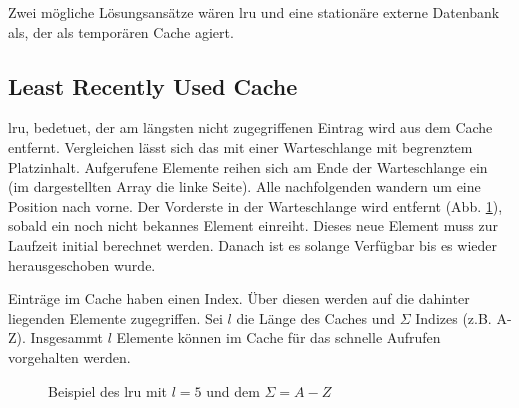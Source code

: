 Zwei mögliche Lösungsansätze wären \ac{lru} und eine stationäre externe Datenbank als, der als temporären Cache agiert.

\subsection{Least Recently Used Cache}\label{lrucache}
\ac{lru}, bedetuet, der am längsten nicht zugegriffenen Eintrag wird aus dem Cache entfernt. Vergleichen lässt sich das mit einer Warteschlange mit begrenztem Platzinhalt. Aufgerufene Elemente reihen sich am Ende der Warteschlange ein (im dargestellten Array die linke Seite). Alle nachfolgenden wandern um eine Position nach vorne. Der Vorderste in der Warteschlange wird entfernt (Abb. \ref{cap:lrucache}), sobald ein noch nicht bekannes Element einreiht. Dieses neue Element muss zur Laufzeit initial berechnet werden. Danach ist es solange Verfügbar bis es wieder herausgeschoben wurde.

Einträge im Cache haben einen Index. Über diesen werden auf die dahinter liegenden Elemente zugegriffen. Sei $l$ die Länge des Caches und $\Sigma$ Indizes (z.B. A-Z). Insgesammt $l$ Elemente können im Cache für das schnelle Aufrufen vorgehalten werden.

\begin{figure}[h]\centering
{}
\caption[Beispiel des \ac{lru}]{Beispiel des \ac{lru} mit $l=5$ und dem $\Sigma=A-Z$}\label{cap:lrucache}
\end{figure}\label{fig:lrucache}


